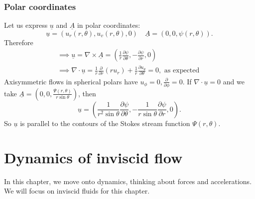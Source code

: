 \documentclass[a4paper]{scrartcl}
\renewcommand{\vec}[1]{\underline{#1}}
\begin{document}
\subsubsection{Polar coordinates}
Let us express $\vec{u}$ and $\vec{A}$ in polar coordinates: \[
\vec{u}=(u_{r}(r,\theta), u_{v}(r, \theta),0) \quad \vec{A}=(0,0,\psi (r,\theta))
.\] 
Therefore 
\begin{align*}
    \implies \vec{u}=\nabla \times \vec{A}=(\frac{1}{r} \frac{\partial \psi}{\partial \theta}, -\frac{\partial \psi}{\partial r},0)\\
    \implies \nabla \cdot \vec{u}= \frac{1}{r} \frac{\partial}{\partial r}(ru_{r})+\frac{1}{r} \frac{\partial u_{\theta}}{\partial \theta}=0, \text{ as expected } 
\end{align*}
Axisymmetric flows in spherical polars have $u_{\phi}=0, \frac{\partial }{\partial \phi}=0$. If $\nabla \cdot \vec{u}=0$ and we take $\vec{A}=(0,0, \frac{\Psi (r, \theta)}{r \sin \theta})$, then \[
\vec{u}=\left(\frac{1}{r^2 \sin \theta} \frac{\partial \psi}{\partial \theta}, -\frac{1}{r \sin \theta}\frac{\partial \psi}{\partial r},0 \right)
.\] So $\vec{u}$ is parallel to the contours of the Stokes stream function $\Psi (r,\theta)$.
\section{Dynamics of inviscid flow}
In this chapter, we move onto dynamics, thinking about forces and accelerations. We will focus on inviscid fluids for this chapter.
\end{document}
